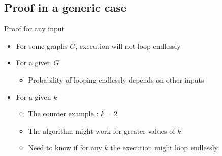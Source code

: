 \subsection{Proof in a generic case}
\begin{frame}{Proof for any input}
  \begin{itemize}
  \item For some graphs $G$, execution will not loop endlessly
  \item For a given $G$
    \begin{itemize}
    \item Probability of looping endlessly depends on other inputs
    \end{itemize}
  \item For a given $k$
    \begin{itemize}
    \item The counter example : $k = 2$
    \item The algorithm might work for greater values of $k$
    \item Need to know if for any $k$ the execution might loop endlessly
    \end{itemize}
  \end{itemize}
\end{frame}


